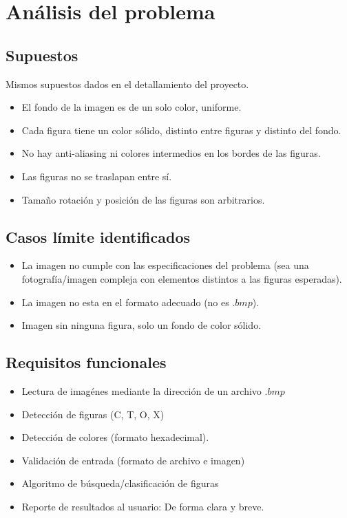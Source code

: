 \documentclass[11pt]{article}
\begin{document}
\section{Análisis del problema}


\subsection{Supuestos}

Mismos supuestos dados en el detallamiento del proyecto. 
\begin{itemize}
    \item El fondo de la imagen es de un solo color, uniforme.
    \item Cada figura tiene un color sólido, distinto entre figuras y distinto del fondo.
    \item No hay anti-aliasing ni colores intermedios en los bordes de las figuras.
    \item Las figuras no se traslapan entre sí.
    \item Tamaño rotación y posición de las figuras son arbitrarios.
\end{itemize}

\subsection{Casos límite identificados}

\begin{itemize}
    \item La imagen no cumple con las especificaciones del problema (sea una fotografía/imagen compleja con elementos distintos a las figuras esperadas). 
    \item La imagen no esta en el formato adecuado (no es $.bmp$).
    \item Imagen sin ninguna figura, solo un fondo de color sólido. 
\end{itemize}

\subsection{Requisitos funcionales}

\begin{itemize}
    \item Lectura de imagénes mediante la dirección de un archivo $.bmp$
    \item Detección de figuras (C, T, O, X)
    \item Detección de colores (formato hexadecimal).
    \item Validación de entrada (formato de archivo e imagen)
    \item Algoritmo de búsqueda/clasificación de figuras
    \item Reporte de resultados al usuario: De forma clara y breve.
\end{itemize}
\end{document}
